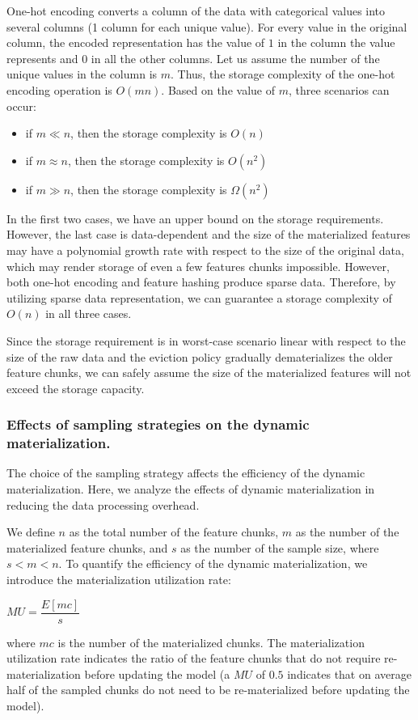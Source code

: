 One-hot encoding converts a column of the data with categorical values into several columns (1 column for each unique value).
For every value in the original column, the encoded representation has the value of $1$ in the column the value represents and $0$ in all the other columns.
Let us assume the number of the unique values in the column is $m$.
Thus, the storage complexity of the one-hot encoding operation is $O(mn)$.
Based on the value of $m$, three scenarios can occur:
\begin{itemize}
\item if $m \ll n$, then the storage complexity is $O(n)$
\item if $m \approx n$, then the storage complexity is $O(n^2)$
\item if $m \gg n$, then the storage complexity is $\Omega (n^2)$
\end{itemize}
In the first two cases, we have an upper bound on the storage requirements.
However, the last case is data-dependent and the size of the materialized features may have a polynomial growth rate with respect to the size of the original data, which may render storage of even a few features chunks impossible.
However, both one-hot encoding and feature hashing produce sparse data.
Therefore, by utilizing sparse data representation, we can guarantee a storage complexity of $O(n)$ in all three cases.

Since the storage requirement is in worst-case scenario linear with respect to the size of the raw data and the eviction policy gradually dematerializes the older feature chunks, we can safely assume the size of the materialized features will not exceed the storage capacity.

\subsubsection{Effects of sampling strategies on the dynamic materialization.}
The choice of the sampling strategy affects the efficiency of the dynamic materialization.
Here, we analyze the effects of dynamic materialization in reducing the data processing overhead.

We define $n$ as the total number of the feature chunks, $m$ as the number of the materialized feature chunks, and $s$ as the number of the sample size, where $s < m < n$. 
To quantify the efficiency of the dynamic materialization, we introduce the materialization utilization rate:
\begin{center}
 $MU = \dfrac{E[mc]}{s}$
\end{center}
where $mc$ is the number of the materialized chunks.
The materialization utilization rate indicates the ratio of the feature chunks that do not require re-materialization before updating the model (a $MU$ of $0.5$ indicates that on average half of the sampled chunks do not need to be re-materialized before updating the model).

